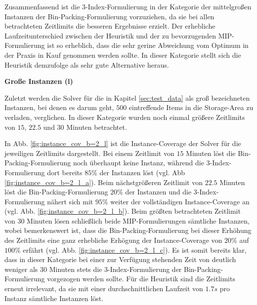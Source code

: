 Zusammenfassend ist die 3-Index-Formulierung in der Kategorie der mittelgroßen Instanzen der Bin-Packing-Formulierung vorzuziehen,
da sie bei allen betrachteten Zeitlimits die besseren Ergebnisse erzielt.
Der erhebliche Laufzeitunterschied zwischen der Heuristik und der zu bevorzugenden MIP-Formulierung ist so erheblich,
dass die sehr gerine Abweichung vom Optimum in der Praxis in Kauf genommen werden sollte.
In dieser Kategorie stellt sich die Heuristik demzufolge als sehr gute Alternative heraus.

\vfill
\pagebreak

\textbf{Große Instanzen (l)}

Zuletzt werden die Solver für die in Kapitel \ref{sec:test_data} als groß bezeichneten Instanzen, bei denen es darum geht,
$500$ eintreffende Items in die Storage-Area zu verladen, verglichen. In dieser Kategorie wurden noch einmal größere Zeitlimits von
$15$, $22.5$ und $30$ Minuten betrachtet.

In Abb. \ref{fig:instance_cov_b=2_l} ist die Instance-Coverage der Solver für die jeweiligen Zeitlimits dargestellt.
Bei einem Zeitlimit von $15$ Minuten löst die Bin-Packing-Formulierung noch überhaupt keine Instanz, während die 3-Index-Formulierung dort bereits $85 \%$ der Instanzen löst (vgl. Abb \ref{fig:instance_cov_b=2_l_a}). Beim nächstgrößeren Zeitlimit von $22.5$ Minuten
löst die Bin-Packing-Formulierung $20 \%$ der Instanzen und die 3-Index-Formulierung nähert sich mit $95 \%$ weiter der vollständigen Instance-Coverage an (vgl. Abb. \ref{fig:instance_cov_b=2_l_b}). Beim größten betrachteten Zeitlimit von $30$ Minuten lösen schließlich beide MIP-Formulierungen sämtliche Instanzen, wobei bemerkenswert ist, dass die Bin-Packing-Formulierung bei dieser Erhöhung des Zeitlimits eine ganz erhebliche Erhögung der Instance-Coverage von $20 \%$ auf $100 \%$ erfährt (vgl. Abb. \ref{fig:instance_cov_b=2_l_c}). Es ist somit bereits klar, dass in dieser Kategorie bei einer zur Verfügung stehenden Zeit von deutlich weniger als $30$ Minuten stets die 3-Index-Formulierung der Bin-Packing-Formulierung vorgezogen werden sollte. Für die Heuristik sind die Zeitlimits erneut irrelevant, da sie mit einer durchschnittlichen Laufzeit von $1.7s$ pro Instanz sämtliche Instanzen löst.


